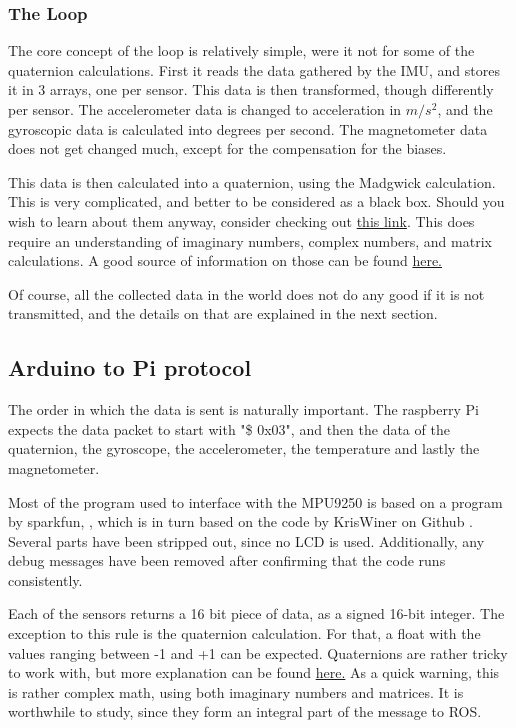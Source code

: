 \subsubsection{The Loop}
The core concept of the loop is relatively simple, were it not for some of the quaternion calculations.
First it reads the data gathered by the IMU, and stores it in 3 arrays, one per sensor.
This data is then transformed, though differently per sensor.
The accelerometer data is changed to acceleration in $m/s^2$, and the gyroscopic data is calculated into degrees per second.
The magnetometer data does not get changed much, except for the compensation for the biases.

This data is then calculated into a quaternion, using the Madgwick calculation.
This is very complicated, and better to be considered as a black box.
Should you wish to learn about them anyway, consider checking out \href{http://www.ijcee.org/vol10/974-T4004.pdf}{this link}.
This does require an understanding of imaginary numbers, complex numbers, and matrix calculations.
A good source of information on those can be found \href{https://www.3dgep.com/understanding-quaternions/#The_Complex_Plane}{here.}

Of course, all the collected data in the world does not do any good if it is not transmitted, and the details on that are explained in the next section.

\subsection{Arduino to Pi protocol}
The order in which the data is sent is naturally important.
The raspberry Pi expects the data packet to start with "\$ 0x03", and then the data of the quaternion, the gyroscope, the accelerometer, the temperature and lastly the magnetometer. 

Most of the program used to interface with the MPU9250 is based on a program by sparkfun, \cite{sparkfunMPU9250}, which is in turn based on the code by KrisWiner on Github \cite{kriswiner}.
Several parts have been stripped out, since no LCD is used.
Additionally, any debug messages have been removed after confirming that the code runs consistently.

Each of the sensors returns a 16 bit piece of data, as a signed 16-bit integer.
The exception to this rule is the quaternion calculation.
For that, a float with the values ranging between -1 and +1 can be expected.
Quaternions are rather tricky to work with, but more explanation can be found \href{https://www.3dgep.com/understanding-quaternions/#The_Complex_Plane}{here.}
As a quick warning, this is rather complex math, using both imaginary numbers and matrices.
It is worthwhile to study, since they form an integral part of the message to ROS.

